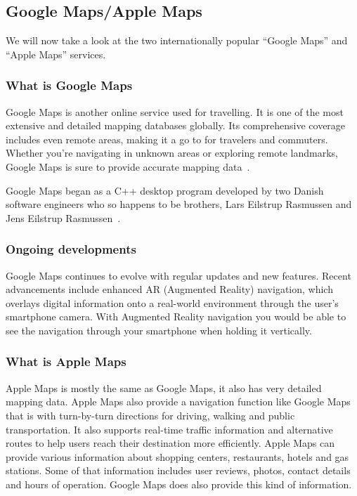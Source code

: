 \subsection{Google Maps/Apple Maps}\label{subsec:google-maps-/-apple-maps}

We will now take a look at the two internationally popular ``Google Maps'' and ``Apple Maps'' services.

\subsubsection{What is Google Maps}

Google Maps is another online service used for travelling.
It is one of the most extensive and detailed mapping databases globally.
Its comprehensive coverage includes even remote areas, making it a go to for travelers and commuters.
Whether you're navigating in unknown areas or exploring remote landmarks, Google Maps is sure to provide accurate
mapping data~\cite{googlemaps2023}.

Google Maps began as a C++ desktop program developed by two Danish software engineers who so happens to be brothers,
Lars Eilstrup Rasmussen and Jens Eilstrup Rasmussen~\cite{googlemaps2023}.

\subsubsection{Ongoing developments}

Google Maps continues to evolve with regular updates and new features.
Recent advancements include enhanced AR (Augmented Reality) navigation, which overlays digital information onto
a real-world environment through the user's smartphone camera.
With Augmented Reality navigation you would be able to see the navigation through your smartphone when holding it
vertically. \cite{googlemapsAR2023}

\subsubsection{What is Apple Maps}

Apple Maps is mostly the same as Google Maps, it also has very detailed mapping data.
Apple Maps also provide a navigation function like Google Maps that is with turn-by-turn directions for driving, walking
and public transportation.
It also supports real-time traffic information and alternative routes to help users reach their destination more
efficiently.
Apple Maps can provide various information about shopping centers, restaurants, hotels and gas stations.
Some of that information includes user reviews, photos, contact details and hours of operation.
Google Maps does also provide this kind of information.

